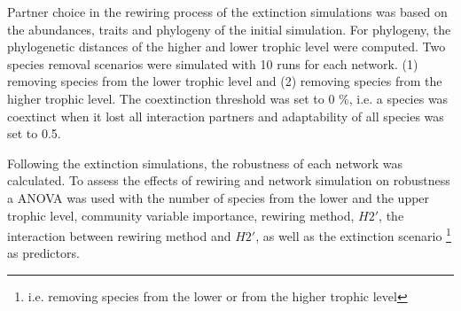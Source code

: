 \documentclass[12pt,a4paper]{article}
\begin{document}
Partner choice in the rewiring process of the extinction simulations was based on the abundances, traits and phylogeny of the initial simulation. For phylogeny, the phylogenetic distances of the higher and lower trophic level were computed. Two species removal scenarios were simulated with 10 runs for each network. (1) removing species from the lower trophic level and (2) removing species from the higher trophic level. The coextinction threshold was set to 0 \%, i.e. a species was coextinct when it lost all interaction partners and adaptability of all species was set to 0.5.


Following the extinction simulations, the robustness of each network was calculated. To assess the effects of rewiring and network simulation on robustness a ANOVA was used with the number of species from the lower and the upper trophic level, community variable importance, rewiring method, $H2'$, the interaction between rewiring method and $H2'$, as well as the extinction scenario \footnote{i.e. removing species from the lower or from the higher trophic level} as predictors.
\end{document}
